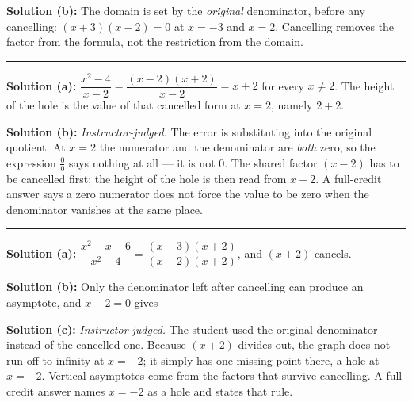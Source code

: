 \documentclass[12pt]{article}
\begin{document}
\textbf{Solution (b):} The domain is set by the \emph{original} denominator,
before any cancelling: $(x+3)(x-2) = 0$ at $x = -3$ and $x = 2$. Cancelling
removes the factor from the formula, not the restriction from the domain.

\vspace{0.25cm}\noindent\rule{\linewidth}{0.2pt}\vspace{0.25cm}


\textbf{Solution (a):} $\dfrac{x^2-4}{x-2} = \dfrac{(x-2)(x+2)}{x-2} = x+2$ for
every $x \ne 2$. The height of the hole is the value of that cancelled form at
$x = 2$, namely $2 + 2$. 

\textbf{Solution (b):} \emph{Instructor-judged.} The error is substituting into
the original quotient. At $x = 2$ the numerator and the denominator are
\emph{both} zero, so the expression $\frac{0}{0}$ says nothing at all --- it is
not $0$. The shared factor $(x-2)$ has to be cancelled first; the height of the
hole is then read from $x+2$. A full-credit answer says a zero numerator does not
force the value to be zero when the denominator vanishes at the same place.

\vspace{0.25cm}\noindent\rule{\linewidth}{0.2pt}\vspace{0.25cm}


\textbf{Solution (a):} $\dfrac{x^2-x-6}{x^2-4} = \dfrac{(x-3)(x+2)}{(x-2)(x+2)}$,
and $(x+2)$ cancels. 

\textbf{Solution (b):} Only the denominator left after cancelling can produce an
asymptote, and $x - 2 = 0$ gives 

\textbf{Solution (c):} \emph{Instructor-judged.} The student used the original
denominator instead of the cancelled one. Because $(x+2)$ divides out, the graph
does not run off to infinity at $x = -2$; it simply has one missing point there,
a hole at $x = -2$. Vertical asymptotes come from the factors that survive
cancelling. A full-credit answer names $x=-2$ as a hole and states that rule.
\end{document}
